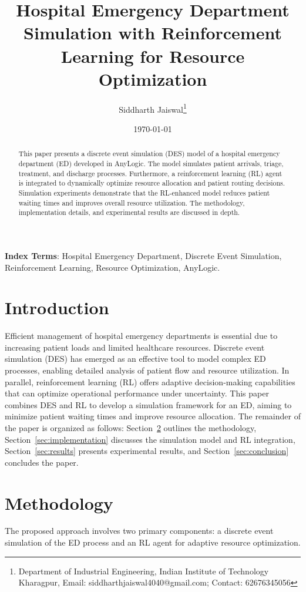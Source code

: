 \documentclass[12pt]{article}
\title{\bf Hospital Emergency Department Simulation with Reinforcement Learning for Resource Optimization}
\author{
    Siddharth Jaiswal\footnote{Department of Industrial Engineering, Indian Institute of Technology Kharagpur, Email: siddharthjaiswal4040@gmail.com; Contact: 62676345056} \\
    }
\date{\today}
\begin{document}
\maketitle

\begin{abstract}
This paper presents a discrete event simulation (DES) model of a hospital emergency department (ED) developed in AnyLogic. The model simulates patient arrivals, triage, treatment, and discharge processes. Furthermore, a reinforcement learning (RL) agent is integrated to dynamically optimize resource allocation and patient routing decisions. Simulation experiments demonstrate that the RL-enhanced model reduces patient waiting times and improves overall resource utilization. The methodology, implementation details, and experimental results are discussed in depth.
\end{abstract}

\noindent \textbf{Index Terms}: Hospital Emergency Department, Discrete Event Simulation, Reinforcement Learning, Resource Optimization, AnyLogic.

\section{Introduction}
Efficient management of hospital emergency departments is essential due to increasing patient loads and limited healthcare resources. Discrete event simulation (DES) has emerged as an effective tool to model complex ED processes, enabling detailed analysis of patient flow and resource utilization. In parallel, reinforcement learning (RL) offers adaptive decision-making capabilities that can optimize operational performance under uncertainty. This paper combines DES and RL to develop a simulation framework for an ED, aiming to minimize patient waiting times and improve resource allocation. The remainder of the paper is organized as follows: Section~\ref{sec:methodology} outlines the methodology, Section~\ref{sec:implementation} discusses the simulation model and RL integration, Section~\ref{sec:results} presents experimental results, and Section~\ref{sec:conclusion} concludes the paper.

\section{Methodology} \label{sec:methodology}
The proposed approach involves two primary components: a discrete event simulation of the ED process and an RL agent for adaptive resource optimization.
\end{document}
